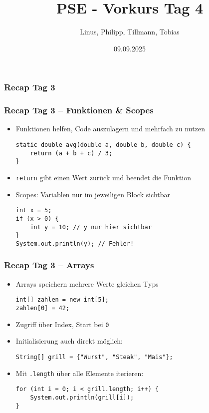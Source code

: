 \documentclass{../../presentation}
\title{PSE - Vorkurs Tag 4}
\author{Linus, Philipp, Tillmann, Tobias}
\institute{FIUS - Fachgruppe Informatik Universität Stuttgart}
\date{09.09.2025}
\begin{document}
\begin{frame}
	\titlepage
\end{frame}

\begin{frame}
	\listoftodos
\end{frame}

\begin{frame}
	\frametitle{Recap Tag 3}
\end{frame}

\begin{frame}[fragile]
	\frametitle{Recap Tag 3 – Funktionen \& Scopes}

	\begin{itemize}
		\item\pause Funktionen helfen, Code auszulagern und mehrfach zu nutzen
		      \begin{verbatim}
static double avg(double a, double b, double c) {
    return (a + b + c) / 3;
}
          \end{verbatim}
		\item\pause \texttt{return} gibt einen Wert zurück und beendet die Funktion
		\item\pause Scopes: Variablen nur im jeweiligen Block sichtbar
		      \begin{verbatim}
int x = 5;
if (x > 0) {
    int y = 10; // y nur hier sichtbar
}
System.out.println(y); // Fehler!
          \end{verbatim}
	\end{itemize}
\end{frame}

\begin{frame}[fragile]
	\frametitle{Recap Tag 3 – Arrays}
	\pause
	\begin{itemize}
		\item\pause Arrays speichern mehrere Werte gleichen Typs
		      \begin{verbatim}
int[] zahlen = new int[5];
zahlen[0] = 42;
          \end{verbatim}
		\item\pause Zugriff über Index, Start bei \texttt{0}
		\item\pause Initialisierung auch direkt möglich:
		      \begin{verbatim}
String[] grill = {"Wurst", "Steak", "Mais"};
          \end{verbatim}
		\item Mit \texttt{.length} über alle Elemente iterieren:
		      \begin{verbatim}
for (int i = 0; i < grill.length; i++) {
    System.out.println(grill[i]);
}
          \end{verbatim}
	\end{itemize}
\end{frame}
\end{document}
